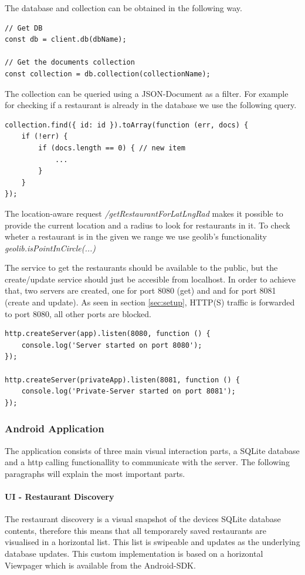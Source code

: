 The database and collection can be obtained in the following way.
\begin{lstlisting}
// Get DB
const db = client.db(dbName);

// Get the documents collection
const collection = db.collection(collectionName);
\end{lstlisting}

The collection can be queried using a JSON-Document as a filter. For example for checking if a restaurant is already in the database we use the following query.
\begin{lstlisting}
collection.find({ id: id }).toArray(function (err, docs) {
	if (!err) {
		if (docs.length == 0) { // new item
			...
		} 
	}
});
\end{lstlisting}

The location-aware request \textit{/getRestaurantForLatLngRad} makes it possible to provide the current location and a radius to look for restaurants in it. To check wheter a restaurant is in the given we range we use geolib's functionality \textit{geolib.isPointInCircle(...)}

The service to get the restaurants should be available to the public, but the create/update service should just be accesible from localhost. In order to achieve that, two servers are created, one for port 8080 (get) and and for port 8081 (create and update). As seen in section \ref{sec:setup}, HTTP(S) traffic is forwarded to port 8080, all other ports are blocked.
\begin{lstlisting}
http.createServer(app).listen(8080, function () {
	console.log('Server started on port 8080');
});

http.createServer(privateApp).listen(8081, function () {
	console.log('Private-Server started on port 8081');
});
\end{lstlisting}

\subsubsection{Android Application}

The application consists of three main visual interaction parts, a SQLite database and a http calling functionallity to communicate with the server. The following paragraphs will explain the most important parts.

\paragraph{UI - Restaurant Discovery}
The restaurant discovery is a visual snapshot of the devices SQLite database contents, therefore this means that all temporarely saved restaurants are visualised in a horizontal list. This list is swipeable and updates as the underlying database updates. This custom implementation is based on a horizontal Viewpager which is available from the Android-SDK.

